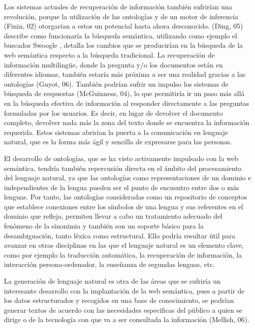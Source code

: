 Los sistemas actuales de recuperación de información también sufrirían una revolución, porque la utilización de las ontologías y de un motor de inferencia (Finin, 02) otorgarían a estos un potencial hasta ahora desconocido. (Ding, 05) describe como funcionaría la búsqueda semántica, utilizando como ejemplo el buscador Swoogle , detalla los cambios que se producirían en la búsqueda de la web semántica respecto a la búsqueda tradicional. La recuperación de información multilingüe, donde la pregunta y/o los documentos están en diferentes idiomas, también estaría más próxima a ser una realidad gracias a las ontologías (Guyot, 06). También podrían sufrir un impulso los sistemas de búsqueda de respuestas (McGuinness, 04), lo que permitiría ir un paso más allá en la búsqueda efectiva de información al responder directamente a las preguntas formuladas por los usuarios. Es decir, en lugar de devolver el documento completo, devolver nada más la zona del texto donde se encuentra la información requerida. Estos sistemas abrirían la puerta a la comunicación en lenguaje natural, que es la forma más ágil y sencilla de expresarse para las personas.

El desarrollo de ontologías, que se ha visto activamente impulsado con la web semántica, tendría también repercusión directa en el ámbito del procesamiento del lenguaje natural, ya que las ontologías como representaciones de un dominio e independientes de la lengua pueden ser el punto de encuentro entre dos o más lenguas. Por tanto, las ontologías consideradas como un repositorio de conceptos que establece conexiones entre los símbolos de una lengua y sus referentes en el dominio que refleja, permiten llevar a cabo un tratamiento adecuado del fenómeno de la sinonimia y también son un soporte básico para la desambiguación, tanto léxica como estructural. Ello podría resultar útil para avanzar en otras disciplinas en las que el lenguaje natural es un elemento clave, como por ejemplo la traducción automática, la recuperación de información, la interacción persona-ordenador, la enseñanza de segundas lenguas, etc.

La generación de lenguaje natural es otra de las áreas que se sufriría un interesante desarrollo con la implantación de la web semántica, pues a partir de los datos estructurados y recogidos en una base de conocimiento, se podrían generar textos de acuerdo con las necesidades especificas del público a quien se dirige o de la tecnología con que va a ser consultada la información (Mellish, 06).

